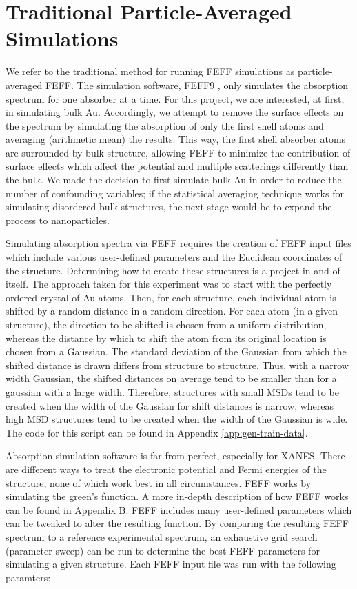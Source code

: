 \section{Traditional Particle-Averaged Simulations} 
\label{sec:traditional-disorder}
We refer to the traditional method for running FEFF simulations as particle-averaged FEFF. The simulation software, FEFF9 \cite{feff-citation}, only simulates the absorption spectrum for one absorber at a time. For this project, we are interested, at first, in simulating bulk Au. Accordingly, we attempt to remove the surface effects on the spectrum by simulating the absorption of only the first shell atoms and averaging (arithmetic mean) the results. This way, the first shell absorber atoms are surrounded by bulk structure, allowing FEFF to minimize the contribution of surface effects which affect the potential and multiple scatterings differently than the bulk. We made the decision to first simulate bulk Au in order to reduce the number of confounding variables; if the statistical averaging technique works for simulating disordered bulk structures, the next stage would be to expand the process to nanoparticles. 

Simulating absorption spectra via FEFF requires the creation of FEFF input files which include various user-defined parameters and the Euclidean coordinates of the structure. Determining how to create these structures is a project in and of itself. The approach taken for this experiment was to start with the perfectly ordered crystal of Au atoms. Then, for each structure, each individual atom is shifted by a random distance in a random direction. For each atom (in a given structure), the direction to be shifted is chosen from a uniform distribution, whereas the distance by which to shift the atom from its original location is chosen from a Gaussian. The standard deviation of the Gaussian from which the shifted distance is drawn differs from structure to structure. Thus, with a narrow width Gaussian, the shifted distances on average tend to be smaller than for a gaussian with a large width. Therefore, structures with small MSDs tend to be created when the width of the Gaussian for shift distances is narrow, whereas high MSD structures tend to be created when the width of the Gaussian is wide. The code for this script can be found in Appendix \ref{app:gen-train-data}.

Absorption simulation software is far from perfect, especially for XANES. There are different ways to treat the electronic potential and Fermi energies of the structure, none of which work best in all circumstances. FEFF works by simulating the green's function. A more in-depth description of how FEFF works can be found in Appendix B. FEFF includes many user-defined parameters which can be tweaked to alter the resulting function. By comparing the resulting FEFF spectrum to a reference experimental spectrum, an exhaustive grid search (parameter sweep) can be run to determine the best FEFF parameters for simulating a given structure. Each FEFF input file was run with the following paramters:

